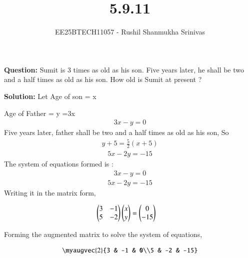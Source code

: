 \documentclass[journal]{IEEEtran}
\begin{document}




\title{5.9.11}
\author{EE25BTECH11057 - Rushil Shanmukha Srinivas
}
{\let\newpage\relax\maketitle}

\renewcommand{\thefigure}{\theenumi}
\renewcommand{\thetable}{\theenumi}
\setlength{\intextsep}{10pt} %

\renewcommand{\thetable}{\theenumi}
\textbf{Question:}
Sumit is 3 times as old as his son. Five years later, he shall be two and a half times as old as his son. How old is Sumit at present ?

\textbf{Solution:}
Let Age of son = x

Age of Father = y =3x
\begin{align}
3x-y=0
\end{align}
Five years later, father shall be two and a half times as old as his son, So
\begin{align}
y+5 = \frac{5}{2}(x+5)
\end{align}
\begin{align}
5x-2y = -15
\end{align}
The system of equations formed is :
\begin{align}
3x-y = 0
\end{align}
\begin{align}
5x-2y = -15
\end{align}
Writing it in the matrix form,

\begin{align}
  \begin{pmatrix}3 & -1\\5 & -2\end{pmatrix}\begin{pmatrix}x\\y\end{pmatrix} &= \begin{pmatrix}0\\-15\end{pmatrix}
\end{align}

Forming the augmented matrix to solve the system of equations,

\begin{align}
  \myaugvec{2}{3 & -1 & 0\\5 & -2 & -15}
\end{align}
\end{document}
